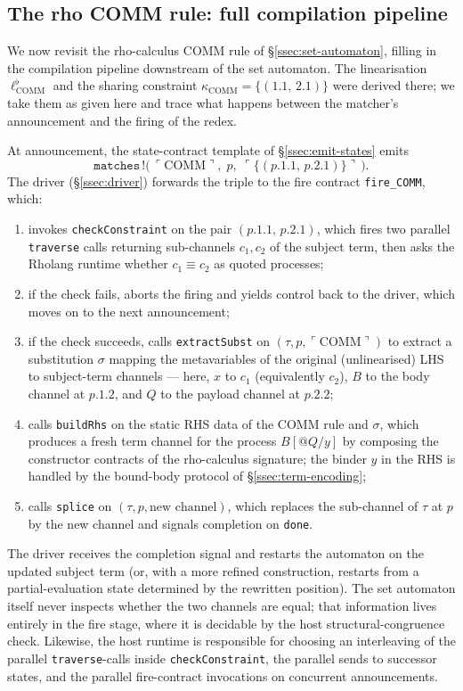 \documentclass[11pt]{article}
\theoremstyle{plain}
\theoremstyle{definition}
\theoremstyle{remark}
\newcommand{\reflect}[1]{\ulcorner #1 \urcorner}
\begin{document}
\subsection{The rho COMM rule: full compilation pipeline}\label{ssec:rho-comm}

We now revisit the rho-calculus COMM rule of \S\ref{ssec:set-automaton},
filling in the compilation pipeline downstream of the set automaton. The
linearisation
$\ell^{\flat}_{\mathrm{COMM}}$ and the sharing constraint
$\kappa_{\mathrm{COMM}} = \{(1.1,\, 2.1)\}$ were derived there; we take
them as given here and trace what happens between the matcher's
announcement and the firing of the redex.

At announcement, the state-contract template of \S\ref{ssec:emit-states}
emits
\[
  \mathtt{matches}\,!\bigl(\,\reflect{\mathrm{COMM}},\; p,\;
                             \reflect{\{(p.1.1,\, p.2.1)\}}\,\bigr).
\]
The driver (\S\ref{ssec:driver}) forwards the triple to the fire
contract \texttt{fire\_COMM}, which:
\begin{enumerate}[leftmargin=*]
  \item invokes \texttt{checkConstraint} on the pair $(p.1.1,\, p.2.1)$,
        which fires two parallel \texttt{traverse} calls returning
        sub-channels $c_1, c_2$ of the subject term, then asks the
        Rholang runtime whether $c_1 \equiv c_2$ as quoted processes;
  \item if the check fails, aborts the firing and yields control back
        to the driver, which moves on to the next announcement;
  \item if the check succeeds, calls \texttt{extractSubst} on
        $(\tau, p, \reflect{\mathrm{COMM}})$ to extract a substitution
        $\sigma$ mapping the metavariables of the original
        (unlinearised) LHS to subject-term channels --- here, $x$ to
        $c_1$ (equivalently $c_2$), $B$ to the body channel at $p.1.2$,
        and $Q$ to the payload channel at $p.2.2$;
  \item calls \texttt{buildRhs} on the static RHS data of the COMM rule
        and $\sigma$, which produces a fresh term channel for the
        process $B[@Q/y]$ by composing the constructor contracts of the
        rho-calculus signature; the binder $y$ in the RHS is handled by
        the bound-body protocol of \S\ref{ssec:term-encoding};
  \item calls \texttt{splice} on $(\tau, p, \text{new channel})$, which
        replaces the sub-channel of $\tau$ at $p$ by the new channel and
        signals completion on \texttt{done}.
\end{enumerate}
The driver receives the completion signal and restarts the automaton on
the updated subject term (or, with a more refined construction, restarts
from a partial-evaluation state determined by the rewritten position).
The set automaton itself never inspects whether the two channels are
equal; that information lives entirely in the fire stage, where it is
decidable by the host structural-congruence check. Likewise, the host
runtime is responsible for choosing an interleaving of the parallel
\texttt{traverse}-calls inside \texttt{checkConstraint}, the parallel
sends to successor states, and the parallel fire-contract invocations
on concurrent announcements.
\end{document}
